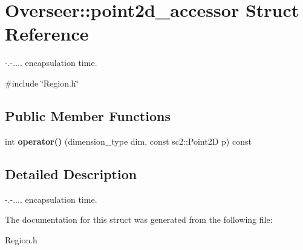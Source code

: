 \hypertarget{structOverseer_1_1point2d__accessor}{}\section{Overseer\+:\+:point2d\+\_\+accessor Struct Reference}
\label{structOverseer_1_1point2d__accessor}


-\/.-\/.... encapsulation time.  




{\ttfamily \#include \char`\"{}Region.\+h\char`\"{}}

\subsection*{Public Member Functions}
\begin{DoxyCompactItemize}
\item 
int {\bfseries operator()} (dimension\+\_\+type dim, const sc2\+::\+Point2D p) const \hypertarget{structOverseer_1_1point2d__accessor_a924f4f62653114f7e70f5868f75b4a1f}{}\label{structOverseer_1_1point2d__accessor_a924f4f62653114f7e70f5868f75b4a1f}

\end{DoxyCompactItemize}


\subsection{Detailed Description}
-\/.-\/.... encapsulation time. 

The documentation for this struct was generated from the following file\+:\begin{DoxyCompactItemize}
\item 
Region.\+h\end{DoxyCompactItemize}
